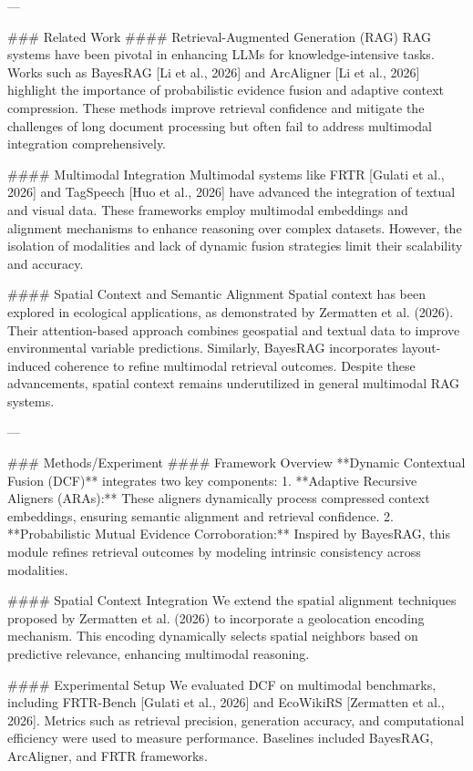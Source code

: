 ---

### Related Work
#### Retrieval-Augmented Generation (RAG)
RAG systems have been pivotal in enhancing LLMs for knowledge-intensive tasks. Works such as BayesRAG [Li et al., 2026] and ArcAligner [Li et al., 2026] highlight the importance of probabilistic evidence fusion and adaptive context compression. These methods improve retrieval confidence and mitigate the challenges of long document processing but often fail to address multimodal integration comprehensively.

#### Multimodal Integration
Multimodal systems like FRTR [Gulati et al., 2026] and TagSpeech [Huo et al., 2026] have advanced the integration of textual and visual data. These frameworks employ multimodal embeddings and alignment mechanisms to enhance reasoning over complex datasets. However, the isolation of modalities and lack of dynamic fusion strategies limit their scalability and accuracy.

#### Spatial Context and Semantic Alignment
Spatial context has been explored in ecological applications, as demonstrated by Zermatten et al. (2026). Their attention-based approach combines geospatial and textual data to improve environmental variable predictions. Similarly, BayesRAG incorporates layout-induced coherence to refine multimodal retrieval outcomes. Despite these advancements, spatial context remains underutilized in general multimodal RAG systems.

---

### Methods/Experiment
#### Framework Overview
**Dynamic Contextual Fusion (DCF)** integrates two key components:
1. **Adaptive Recursive Aligners (ARAs):** These aligners dynamically process compressed context embeddings, ensuring semantic alignment and retrieval confidence.
2. **Probabilistic Mutual Evidence Corroboration:** Inspired by BayesRAG, this module refines retrieval outcomes by modeling intrinsic consistency across modalities.

#### Spatial Context Integration
We extend the spatial alignment techniques proposed by Zermatten et al. (2026) to incorporate a geolocation encoding mechanism. This encoding dynamically selects spatial neighbors based on predictive relevance, enhancing multimodal reasoning.

#### Experimental Setup
We evaluated DCF on multimodal benchmarks, including FRTR-Bench [Gulati et al., 2026] and EcoWikiRS [Zermatten et al., 2026]. Metrics such as retrieval precision, generation accuracy, and computational efficiency were used to measure performance. Baselines included BayesRAG, ArcAligner, and FRTR frameworks.

